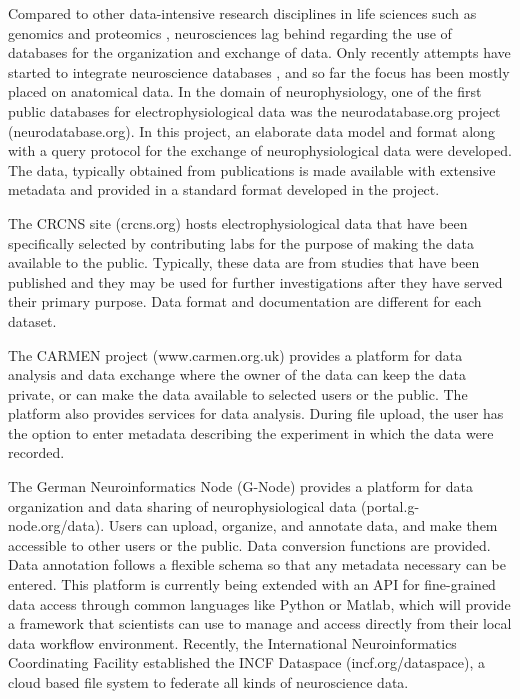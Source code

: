 \documentclass{frontiersSCNS} %
\begin{document}
Compared to other data-intensive research disciplines in life sciences such as
genomics and proteomics \citep{Gelbart1997, Stoesser1997, DeSchutter2008},
neurosciences lag behind regarding the use of databases for the organization
and exchange of data. Only recently attempts have started to
integrate neuroscience databases \citep{Amari2002, Gupta2008}, and so
far the focus has been mostly placed on anatomical data. In the domain of
neurophysiology, one of the first public databases for electrophysiological
data was the neurodatabase.org project (neurodatabase.org). In this project, an
elaborate data model and format along with a query protocol for the exchange of
neurophysiological data were developed. The data, typically obtained from
publications is made available with extensive metadata and provided in a
standard format developed in the project.

The CRCNS site (crcns.org) hosts electrophysiological data that have been
specifically selected by contributing labs for the purpose of making the data
available to the public. Typically, these data are from studies that have been
published and they may be used for further investigations after they have
served their primary purpose. Data format and documentation are different for
each dataset.

The CARMEN project (www.carmen.org.uk) provides a platform for data analysis
and data exchange where the owner of the data can keep the data private, or can
make the data available to selected users or the public. The platform also
provides services for data analysis. During file upload, the user has the
option to enter metadata describing the experiment in which the data were
recorded. 

The German Neuroinformatics Node (G-Node) provides a platform for data
organization and data sharing of neurophysiological data
(portal.g-node.org/data). Users can upload, organize, and annotate data, and
make them accessible to other users or the public. Data conversion functions
are provided. Data annotation follows a flexible schema \citep{Grewe2011} so
that any metadata necessary can be entered. This platform is currently being
extended with an API for fine-grained data access through common languages like
Python or Matlab, which will provide a framework that scientists can use to
manage and access directly from their local data workflow environment.
Recently, the International Neuroinformatics Coordinating Facility established
the INCF Dataspace (incf.org/dataspace), a cloud based file system to federate
all kinds of neuroscience data.
\end{document}
